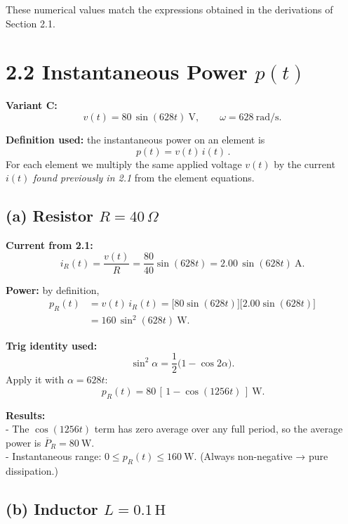 \documentclass{article}
\begin{document}
\noindent
These numerical values match the expressions obtained in the derivations of Section 2.1.

\vspace{0.5cm}

\section*{2.2 \; Instantaneous Power $p(t)$}

\noindent\textbf{Variant C:}
\[
v(t)=80\,\sin(628t)\ \text{V},\qquad \omega=628\ \text{rad/s}.
\]

\noindent\textbf{Definition used:} the instantaneous power on an element is
\[
\boxed{\,p(t)=v(t)\,i(t)\,}.
\]
For each element we multiply the same applied voltage $v(t)$ by the current $i(t)$
\emph{found previously in 2.1} from the element equations.

\vspace{0.8em}
\subsection*{(a) Resistor $R=40\,\Omega$}

\noindent\textbf{Current from 2.1:} 
\[
i_R(t)=\frac{v(t)}{R}=\frac{80}{40}\sin(628t)=2.00\,\sin(628t)\ \text{A}.
\]

\noindent\textbf{Power:} by definition,
\[
\begin{aligned}
p_R(t)&=v(t)\,i_R(t)=\big[80\sin(628t)\big]\big[2.00\sin(628t)\big]\\
      &=160\,\sin^2(628t)\ \text{W}.
\end{aligned}
\]

\noindent\textbf{Trig identity used:} 
\[
\sin^2\alpha=\frac{1}{2}\big(1-\cos 2\alpha\big).
\]
Apply it with $\alpha=628t$:
\[
\boxed{\,p_R(t)=80\,[\,1-\cos(1256t)\,]\ \text{W}.}
\]

\noindent\textbf{Results:}
\\
- The \(\cos(1256t)\) term has zero average over any full period, so the average power is
  \(\overline P_R=80\ \text{W}\).
  \\
- Instantaneous range: \(0\le p_R(t)\le 160\ \text{W}\). (Always non-negative → pure dissipation.)

\vspace{0.8em}
\subsection*{(b) Inductor $L=0.1\,\text{H}$}
\end{document}
